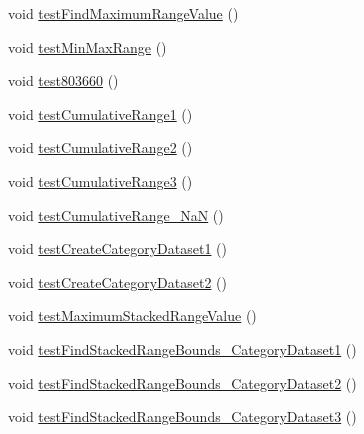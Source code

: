 \begin{DoxyCompactItemize}
\item 
void \mbox{\hyperlink{classorg_1_1jfree_1_1data_1_1general_1_1_dataset_utilities_test_a409b8da365c693eef48ea61a72c5290e}{test\+Find\+Maximum\+Range\+Value}} ()
\item 
void \mbox{\hyperlink{classorg_1_1jfree_1_1data_1_1general_1_1_dataset_utilities_test_a327abe58fe348daa90de6f5b0217e5c6}{test\+Min\+Max\+Range}} ()
\item 
void \mbox{\hyperlink{classorg_1_1jfree_1_1data_1_1general_1_1_dataset_utilities_test_ab4784ef1b12ca3ca74c512ff17b5bab0}{test803660}} ()
\item 
void \mbox{\hyperlink{classorg_1_1jfree_1_1data_1_1general_1_1_dataset_utilities_test_a7cbfad50ea30a34570aec3e6802eb149}{test\+Cumulative\+Range1}} ()
\item 
void \mbox{\hyperlink{classorg_1_1jfree_1_1data_1_1general_1_1_dataset_utilities_test_aced6a4a3e112d5bc03f6519090692a53}{test\+Cumulative\+Range2}} ()
\item 
void \mbox{\hyperlink{classorg_1_1jfree_1_1data_1_1general_1_1_dataset_utilities_test_aa843c3f4b279437048453cd02d295daf}{test\+Cumulative\+Range3}} ()
\item 
void \mbox{\hyperlink{classorg_1_1jfree_1_1data_1_1general_1_1_dataset_utilities_test_a3a97ff145182caeb2be1b7d6de372bbc}{test\+Cumulative\+Range\+\_\+\+NaN}} ()
\item 
void \mbox{\hyperlink{classorg_1_1jfree_1_1data_1_1general_1_1_dataset_utilities_test_a80f267bcedcb3639fd75bb76c664ca5a}{test\+Create\+Category\+Dataset1}} ()
\item 
void \mbox{\hyperlink{classorg_1_1jfree_1_1data_1_1general_1_1_dataset_utilities_test_a0d6b3c95f7481a606588857cf9b42691}{test\+Create\+Category\+Dataset2}} ()
\item 
void \mbox{\hyperlink{classorg_1_1jfree_1_1data_1_1general_1_1_dataset_utilities_test_adcfb1abfb2ee1d7f8a0b8f4dbec615d8}{test\+Maximum\+Stacked\+Range\+Value}} ()
\item 
void \mbox{\hyperlink{classorg_1_1jfree_1_1data_1_1general_1_1_dataset_utilities_test_a87edd432a3c324414ad754d8cf04e35c}{test\+Find\+Stacked\+Range\+Bounds\+\_\+\+Category\+Dataset1}} ()
\item 
void \mbox{\hyperlink{classorg_1_1jfree_1_1data_1_1general_1_1_dataset_utilities_test_af50dc912e8782dc292faf6c82a4634a3}{test\+Find\+Stacked\+Range\+Bounds\+\_\+\+Category\+Dataset2}} ()
\item 
void \mbox{\hyperlink{classorg_1_1jfree_1_1data_1_1general_1_1_dataset_utilities_test_a81b96d0bbe1d5d22efd69c09cbcd555f}{test\+Find\+Stacked\+Range\+Bounds\+\_\+\+Category\+Dataset3}} ()

\end{DoxyCompactItemize}
